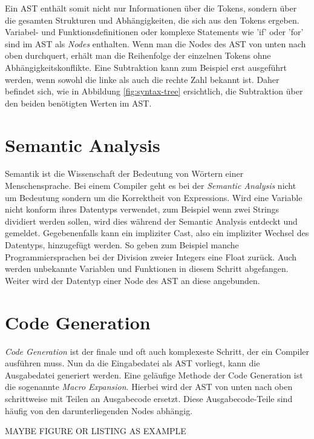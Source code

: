 Ein AST enthält somit nicht nur Informationen über die Tokens, sondern über die gesamten Strukturen und Abhängigkeiten, die sich aus den Tokens ergeben. Variabel- und Funktionsdefinitionen oder komplexe Statements wie 'if' oder 'for'
sind im AST als \textit{Nodes} enthalten. Wenn man die Nodes des AST von unten nach oben durchquert, erhält man die Reihenfolge der einzelnen Tokens ohne Abhängigkeitskonflikte.
Eine Subtraktion kann zum Beispiel erst ausgeführt werden, wenn sowohl die linke als auch die rechte Zahl bekannt ist.
Daher befindet sich, wie in Abbildung \ref{fig:syntax-tree} ersichtlich, die Subtraktion über den beiden benötigten Werten im AST.

\section{Semantic Analysis}
Semantik ist die Wissenschaft der Bedeutung von Wörtern einer Menschensprache. Bei einem Compiler geht es bei der \textit{Semantic Analysis} nicht um Bedeutung sondern um die Korrektheit von Expressions.
Wird eine Variable nicht konform ihres Datentyps verwendet, zum Beispiel wenn zwei Strings dividiert werden sollen, wird dies während der Semantic Analysis entdeckt und gemeldet.
Gegebenenfalls kann ein impliziter Cast, also ein impliziter Wechsel des Datentyps, hinzugefügt werden.
So geben zum Beispiel manche Programmiersprachen bei der Division zweier Integers eine Float zurück.
Auch werden unbekannte Variablen und Funktionen in diesem Schritt abgefangen.
Weiter wird der Datentyp einer Node des AST an diese angebunden.

\section{Code Generation} \label{sec:traditional_code_generation}
\textit{Code Generation} ist der finale und oft auch komplexeste Schritt, der ein Compiler ausführen muss.
Nun da die Eingabedatei als AST vorliegt, kann die Ausgabedatei generiert werden. Eine geläufige Methode der Code Generation ist die sogenannte \textit{Macro Expansion}.
Hierbei wird der AST von unten nach oben schrittweise mit Teilen an Ausgabecode ersetzt.
Diese Ausgabecode-Teile sind häufig von den darunterliegenden Nodes abhängig. 

MAYBE FIGURE OR LISTING AS EXAMPLE

